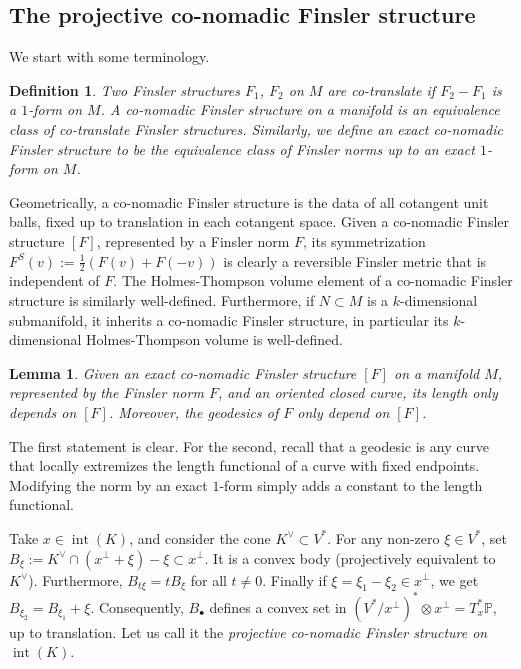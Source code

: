 \documentclass[reqno,10pt]{amsart}
\newcommand{\blue}{}
\newcounter{mp}
\newtheorem{Definition}[Proposition]{Definition}
\newtheorem{Lemma}[Proposition]{Lemma}
\DeclareMathOperator{\inter}{int}
\newcommand{\PP}{\mathbb{P}}
\begin{document}
\subsection{The projective co-nomadic Finsler structure}
We start with some terminology.
\begin{Definition}\label{def:conomadic}
	Two Finsler structures $F_1$, $F_2$ on $M$ are \emph{co-translate} if $F_2-F_1$ is a $1$-form on $M$.
	A \emph{co-nomadic Finsler structure} on a manifold is an equivalence class of co-translate Finsler structures.
	{\blue Similarly, we define an \emph{exact co-nomadic Finsler structure} to be the equivalence class of Finsler norms up to an exact $1$-form on $M$. }
\end{Definition}
Geometrically, a co-nomadic Finsler structure is the data of all cotangent unit balls, fixed up to translation in each cotangent space. Given a co-nomadic Finsler structure $[F]$, represented by a Finsler norm $F$, its symmetrization $F^S(v):=\frac{1}2(F(v)+F(-v))$ is clearly a  reversible Finsler metric that is independent of $F$. The Holmes-Thompson volume element of a co-nomadic Finsler structure is similarly well-defined. {\blue  Furthermore, if $N\subset M$ is a $k$-dimensional submanifold, it inherits a co-nomadic Finsler structure, in particular its $k$-dimensional Holmes-Thompson volume is well-defined.}
{\blue 
\begin{Lemma}\label{lem:exact_property}
	Given an \emph{exact} co-nomadic Finsler structure $[F]$ on a manifold $M$, represented by the Finsler norm $F$, and an oriented closed curve, its length only depends on $[F]$. Moreover, the geodesics of $F$ only depend on $[F]$.
\end{Lemma}
\proof
The first statement is clear. For the second, recall that a geodesic is any curve that locally extremizes the length functional of a curve with fixed endpoints. Modifying the norm by an exact $1$-form simply adds a constant to the length functional.
\endproof }
 Take $x\in \inter(K)$, and consider the cone $K^\vee\subset V^*$. For any non-zero $\xi\in V^*$, set $B_\xi:=K^\vee\cap (x^\perp +\xi)-\xi\subset x^\perp$. It is a convex body (projectively equivalent to $K^\vee$). Furthermore, $B_{t\xi}=tB_{\xi}$ for all $t\neq 0$. Finally if $\xi=\xi_1-\xi_2\in x^\perp$, we get $B_{\xi_2}=B_{\xi_1}+\xi$.
Consequently, $B_\bullet$ defines a convex set in $(V^*/x^\perp)^*\otimes x^\perp=T^*_x\PP$, up to translation. 
Let us call it the \emph{projective co-nomadic Finsler structure on $\inter(K)$}.
\end{document}
